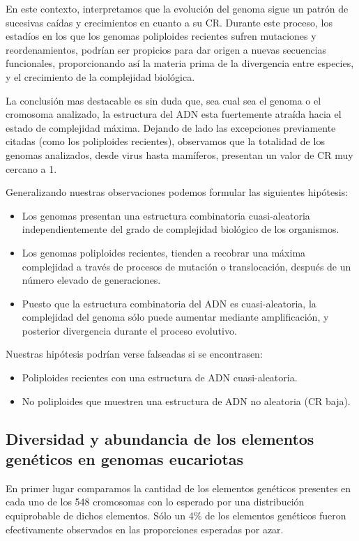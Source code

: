 En este contexto, interpretamos que la evolución del genoma sigue un patrón de sucesivas caídas y crecimientos en cuanto a su CR. Durante este proceso, los estadíos en los que los genomas poliploides recientes sufren mutaciones y reordenamientos, podrían ser propicios para dar origen a nuevas secuencias funcionales, proporcionando así la materia prima de la divergencia entre especies, y el crecimiento de la complejidad biológica.

La conclusión mas destacable es sin duda que, sea cual sea el genoma o el cromosoma analizado, la estructura del ADN esta fuertemente atraída hacia el estado de complejidad máxima. Dejando de lado las excepciones previamente citadas (como los poliploides recientes), observamos que la totalidad de los genomas analizados, desde virus hasta mamíferos, presentan un valor de CR muy cercano a 1.

Generalizando nuestras observaciones podemos formular las siguientes hipótesis:
\begin{itemize}
\item Los genomas presentan una estructura combinatoria cuasi-aleatoria independientemente del grado de complejidad biológico de los organismos.
\item Los genomas poliploides recientes, tienden a recobrar una máxima complejidad a través de procesos de mutación o translocación, después de un número elevado de generaciones.
\item Puesto que la estructura combinatoria del ADN es cuasi-aleatoria, la complejidad del genoma sólo puede aumentar mediante amplificación, y posterior divergencia durante el proceso evolutivo.
\end{itemize}
Nuestras hipótesis podrían verse falseadas si se encontrasen:
\begin{itemize}
\item Poliploides recientes con una estructura de ADN cuasi-aleatoria.
\item No poliploides que muestren una estructura de ADN no aleatoria (CR baja).
\end{itemize}

\subsection*{Diversidad y abundancia de los elementos genéticos en genomas eucariotas}

En primer lugar comparamos la cantidad de los elementos genéticos presentes en cada uno de los 548 cromosomas con lo esperado por una distribución equiprobable de dichos elementos. Sólo un 4\% de los elementos genéticos fueron efectivamente observados en las proporciones esperadas por azar.

